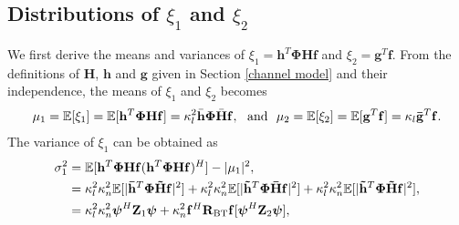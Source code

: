 \documentclass[journal,draftclsnofoot,onecolumn,12pt]{IEEEtran}
\begin{document}
\subsection{Distributions of $\xi_1$ and $\xi_2$}\label{AppB}
We first derive the means and variances of $\xi_1=\mathbf{h}^T\mathbf{\Phi}\mathbf{H f}$ and $\xi_2=\mathbf{g}^T\mathbf{f}$.
 From the definitions of $\mathbf{H}$, $\mathbf{h}$ and $\mathbf{g}$ given in Section \ref{channel model} and their independence, the means of $\xi_1$ and $\xi_2$ becomes
 \begin{align}
       \mu_1=\mathbb{E}[\xi_1] =  \mathbb{E}[\mathbf{h}^T\mathbf{\Phi}\mathbf{H f}]=\kappa_l^2 \Bar{\mathbf{h}} \mathbf{\Phi} \Bar{\mathbf{H}} \mathbf{f},~~\text{and}~~ \mu_2=\mathbb{E}[\xi_2] = \mathbb{E}[\mathbf{g}^T\mathbf{f}]=\kappa_l\mathbf{\bar{g}}^T\mathbf{f}.  \label{appendixB_mu1mu2}
 \end{align}
The variance of $\xi_1$  can be obtained as
 \begin{align}
       \sigma_1^2&=\mathbb{E}[\mathbf{h}^T\mathbf{\Phi}\mathbf{H}\mathbf{f}(\mathbf{h}^T\mathbf{\Phi}\mathbf{H}\mathbf{f})^H]-|\mu_1|^2,\nonumber\\
       &=  \kappa_l^2\kappa_n^2 \mathbb{E}[|\mathbf{\Bar{h}}^T\mathbf{\Phi}\mathbf{\Tilde{H}f}|^2] + \kappa_l^2\kappa_n^2\mathbb{E}[|\mathbf{\Tilde{h}}^T\mathbf{\Phi}\mathbf{\Bar{H}f}|^2] + \kappa_l^2\kappa_n^2\mathbb{E}[|\mathbf{\Tilde{h}}^T\mathbf{\Phi}\mathbf{\Tilde{H}f}|^2],\nonumber\\
       &=\kappa_l^2\kappa_n^2\boldsymbol{\psi}^H\mathbf{Z}_1 \boldsymbol{\psi} + \kappa_n^2\mathbf{f}^H\mathbf{R}_{\rm BT}\mathbf{f}[\boldsymbol{\psi}^H\mathbf{Z}_2\boldsymbol{\psi}],\label{appendixB_sigam_1}
 \end{align}
\end{document}
